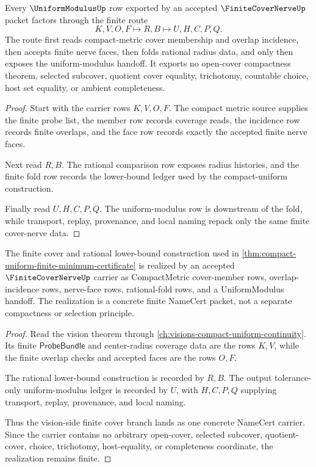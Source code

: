 \begin{theorem}
\label{thm:finite-cover-nerve-compact-uniform-handoff}
Every $\UniformModulusUp$ row exported by an accepted $\FiniteCoverNerveUp$ packet factors through the finite route
$$
K,V,O,F \longmapsto R,B \longmapsto U,H,C,P,Q .
$$
The route first reads compact-metric cover membership and overlap incidence, then accepts finite nerve faces, then folds rational radius data, and only then exposes the uniform-modulus handoff. It exports no open-cover compactness theorem, selected subcover, quotient cover equality, trichotomy, countable choice, host set equality, or ambient completeness.
\end{theorem}
\begin{proof}
Start with the carrier rows $K,V,O,F$. The compact metric source supplies the finite probe list, the member row records coverage reads, the incidence row records finite overlaps, and the face row records exactly the accepted finite nerve faces.

Next read $R,B$. The rational comparison row exposes radius histories, and the finite fold row records the lower-bound ledger used by the compact-uniform construction.

Finally read $U,H,C,P,Q$. The uniform-modulus row is downstream of the fold, while transport, replay, provenance, and local naming repack only the same finite cover-nerve data.
\end{proof}

\begin{theorem}
\label{thm:finite-cover-nerve-vision-realization}
The finite cover and rational lower-bound construction used in \autoref{thm:compact-uniform-finite-minimum-certificate} is realized by an accepted $\FiniteCoverNerveUp$ carrier as CompactMetric cover-member rows, overlap-incidence rows, nerve-face rows, rational-fold rows, and a UniformModulus handoff. The realization is a concrete finite NameCert packet, not a separate compactness or selection principle.
\end{theorem}
\begin{proof}
Read the vision theorem through \autoref{ch:visions-compact-uniform-continuity}. Its finite $\mathsf{ProbeBundle}$ and center-radius coverage data are the rows $K,V$, while the finite overlap checks and accepted faces are the rows $O,F$.

The rational lower-bound construction is recorded by $R,B$. The output tolerance-only uniform-modulus ledger is recorded by $U$, with $H,C,P,Q$ supplying transport, replay, provenance, and local naming.

Thus the vision-side finite cover branch lands as one concrete NameCert carrier. Since the carrier contains no arbitrary open-cover, selected subcover, quotient-cover, choice, trichotomy, host-equality, or completeness coordinate, the realization remains finite.
\end{proof}

